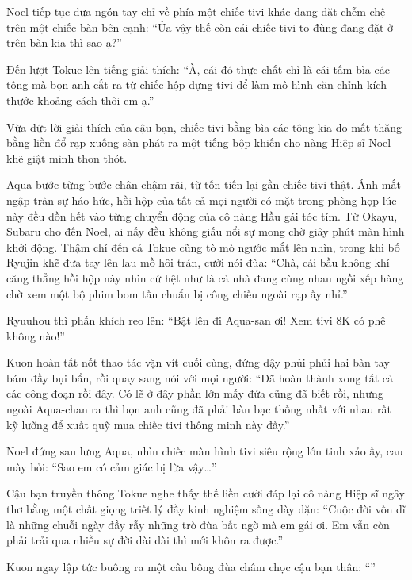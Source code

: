 \documentclass[../main.tex]{subfiles}
\begin{document}
Noel tiếp tục đưa ngón tay chỉ về phía một chiếc tivi khác đang đặt chễm chệ trên một chiếc bàn bên cạnh: ``Ủa vậy thế còn cái chiếc tivi to đùng đang đặt ở trên bàn kia thì sao ạ?''

Đến lượt Tokue lên tiếng giải thích: ``À, cái đó thực chất chỉ là cái tấm bìa các-tông mà bọn anh cắt ra từ chiếc hộp đựng tivi để làm mô hình căn chỉnh kích thước khoảng cách thôi em ạ.''

Vừa dứt lời giải thích của cậu bạn, chiếc tivi bằng bìa các-tông kia do mất thăng bằng liền đổ rạp xuống sàn phát ra một tiếng bộp khiến cho nàng Hiệp sĩ Noel khẽ giật mình thon thót.


Aqua bước từng bước chân chậm rãi, từ tốn tiến lại gần chiếc tivi thật. Ánh mắt ngập tràn sự háo hức, hồi hộp của tất cả mọi người có mặt trong phòng họp lúc này đều dồn hết vào từng chuyển động của cô nàng Hầu gái tóc tím. Từ Okayu, Subaru cho đến Noel, ai nấy đều không giấu nổi sự mong chờ giây phút màn hình khởi động. Thậm chí đến cả Tokue cũng tò mò ngước mắt lên nhìn, trong khi bố Ryujin khẽ đưa tay lên lau mồ hôi trán, cười nói đùa: ``Chà, cái bầu không khí căng thẳng hồi hộp này nhìn cứ hệt như là cả nhà đang cùng nhau ngồi xếp hàng chờ xem một bộ phim bom tấn chuẩn bị công chiếu ngoài rạp ấy nhỉ.''

Ryuuhou thì phấn khích reo lên: ``Bật lên đi Aqua-san ơi! Xem tivi 8K có phê không nào!''

Kuon hoàn tất nốt thao tác vặn vít cuối cùng, đứng dậy phủi phủi hai bàn tay bám đầy bụi bẩn, rồi quay sang nói với mọi người: ``Đã hoàn thành xong tất cả các công đoạn rồi đây. Có lẽ ở đây phần lớn mấy đứa cũng đã biết rồi, nhưng ngoài Aqua-chan ra thì bọn anh cũng đã phải bàn bạc thống nhất với nhau rất kỹ lưỡng để xuất quỹ mua chiếc tivi thông minh này đấy.''

Noel đứng sau lưng Aqua, nhìn chiếc màn hình tivi siêu rộng lớn tinh xảo ấy, cau mày hỏi: ``Sao em có cảm giác bị lừa vậy\dots''

Cậu bạn truyền thông Tokue nghe thấy thế liền cười đáp lại cô nàng Hiệp sĩ ngây thơ bằng một chất giọng triết lý đầy kinh nghiệm sống dày dặn: ``Cuộc đời vốn dĩ là những chuỗi ngày đầy rẫy những trò đùa bất ngờ mà em gái ơi. Em vẫn còn phải trải qua nhiều sự đời dài dài thì mới khôn ra được.''

Kuon ngay lập tức buông ra một câu bông đùa châm chọc cậu bạn thân: ``''
\end{document}
